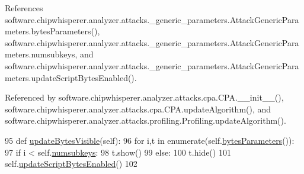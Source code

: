 References software.\+chipwhisperer.\+analyzer.\+attacks.\+\_\+generic\+\_\+parameters.\+Attack\+Generic\+Parameters.\+bytes\+Parameters(), software.\+chipwhisperer.\+analyzer.\+attacks.\+\_\+generic\+\_\+parameters.\+Attack\+Generic\+Parameters.\+numsubkeys, and software.\+chipwhisperer.\+analyzer.\+attacks.\+\_\+generic\+\_\+parameters.\+Attack\+Generic\+Parameters.\+update\+Script\+Bytes\+Enabled().



Referenced by software.\+chipwhisperer.\+analyzer.\+attacks.\+cpa.\+C\+P\+A.\+\_\+\+\_\+init\+\_\+\+\_\+(), software.\+chipwhisperer.\+analyzer.\+attacks.\+cpa.\+C\+P\+A.\+update\+Algorithm(), and software.\+chipwhisperer.\+analyzer.\+attacks.\+profiling.\+Profiling.\+update\+Algorithm().


\begin{DoxyCode}
95     \textcolor{keyword}{def }\hyperlink{classsoftware_1_1chipwhisperer_1_1analyzer_1_1attacks_1_1__generic__parameters_1_1AttackGenericParameters_ae8a1fd55489a32a4e3b786b084affc9d}{updateBytesVisible}(self):
96         \textcolor{keywordflow}{for} i,t \textcolor{keywordflow}{in} enumerate(self.\hyperlink{classsoftware_1_1chipwhisperer_1_1analyzer_1_1attacks_1_1__generic__parameters_1_1AttackGenericParameters_aec590b908b8c3ddf781b2497957e9b84}{bytesParameters}()):
97             \textcolor{keywordflow}{if} i < self.\hyperlink{classsoftware_1_1chipwhisperer_1_1analyzer_1_1attacks_1_1__generic__parameters_1_1AttackGenericParameters_aed19c974ec412f46ba6f21a2d7c60852}{numsubkeys}:
98                 t.show()
99             \textcolor{keywordflow}{else}:
100                 t.hide()
101         self.\hyperlink{classsoftware_1_1chipwhisperer_1_1analyzer_1_1attacks_1_1__generic__parameters_1_1AttackGenericParameters_a8226897875845b078a9a68fc42973a84}{updateScriptBytesEnabled}()
102 
\end{DoxyCode}
\hypertarget{classsoftware_1_1chipwhisperer_1_1analyzer_1_1attacks_1_1__generic__parameters_1_1AttackGenericParameters_ad0e8132c59e638b2c743d4e9dc26ffdd}{}
